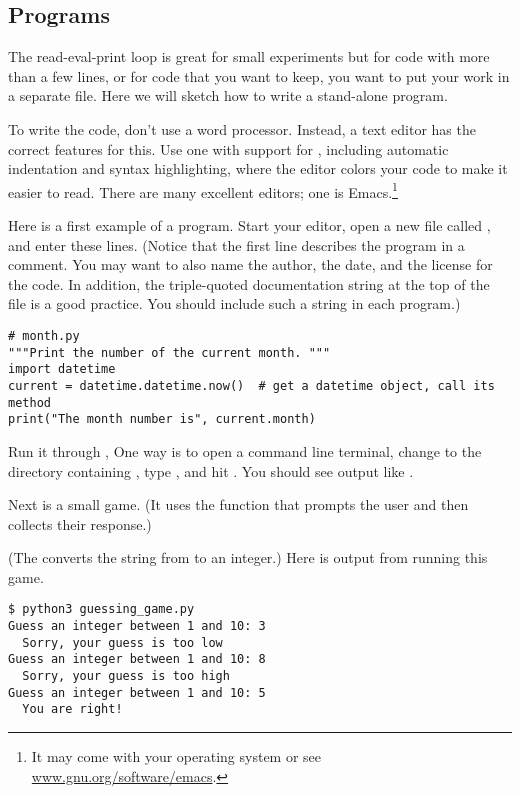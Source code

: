 \subsection{Programs}
The read-eval-print loop is great for small experiments but
for code with more than a few lines, or for code that you want to
keep, you want to put your work in a separate file.
Here we will sketch how to write a stand-alone program.

To write the code, 
don't use a word processor.
Instead, a text editor has the correct features for this.
Use one with support for \python{}, including
automatic indentation and  
syntax highlighting, where the editor colors your code to make it easier to
read.
There are many excellent editors; one is Emacs.\footnote{%
  It may come with your operating system or 
  see \protect\url{www.gnu.org/software/emacs}.}

Here is a first example of a \python{} program.
Start your editor, open a new file called , and enter these lines.
(Notice that the first line describes the program in a comment.
You may want to also name the author, the date, and the license for the code.
In addition, the triple-quoted documentation string at the top of the file
is a good practice.
You should include such a string in each program.)
\begin{lstlisting}[style=python]
# month.py
"""Print the number of the current month. """
import datetime
current = datetime.datetime.now()  # get a datetime object, call its method
print("The month number is", current.month)
\end{lstlisting}
Run it through \python{},
One way is to open a command line terminal,
change to the directory containing ,  
type , and hit . 
You should see
output like .

Next is a small game. 
(It uses the \python{} function  that prompts the user
and then collects their response.)

(The  converts the string from  to an integer.)
Here is output from running this game.
\begin{lstlisting}
$ python3 guessing_game.py
Guess an integer between 1 and 10: 3
  Sorry, your guess is too low
Guess an integer between 1 and 10: 8
  Sorry, your guess is too high
Guess an integer between 1 and 10: 5
  You are right!
\end{lstlisting}  %

